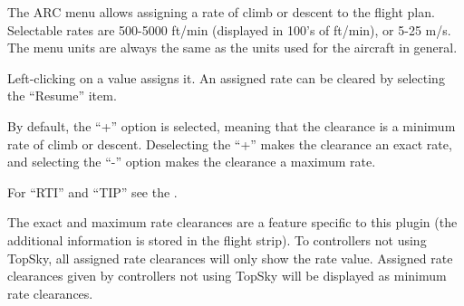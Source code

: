 \documentclass[11pt,a4paper]{memoir}
\newenvironment{Warn}
  {\begin{shaded}\marginnote{\fbox{Warning}}}
  {\end{shaded}}
\begin{document}
The ARC menu allows assigning a rate of climb or descent to the flight plan. Selectable
rates are 500-5000 ft/min (displayed in 100’s of ft/min), or 5-25 m/s. The menu units are
always the same as the units used for the aircraft in general.

Left-clicking on a value assigns it. An assigned rate can be cleared by selecting the
“Resume” item.

By default, the “+” option is selected, meaning that the clearance is a minimum rate of
climb or descent. Deselecting the “+” makes the clearance an exact rate, and selecting
the “-” option makes the clearance a maximum rate.

For “RTI” and “TIP” see the \textit{}.

\begin{Warn}
The exact and maximum rate clearances are a feature specific to this plugin (the additional information is stored in the flight strip). To controllers not using TopSky, all assigned rate clearances will only show the rate value.
Assigned rate clearances given by controllers not using TopSky will be displayed as minimum rate clearances.      
\end{Warn}
\end{document}
